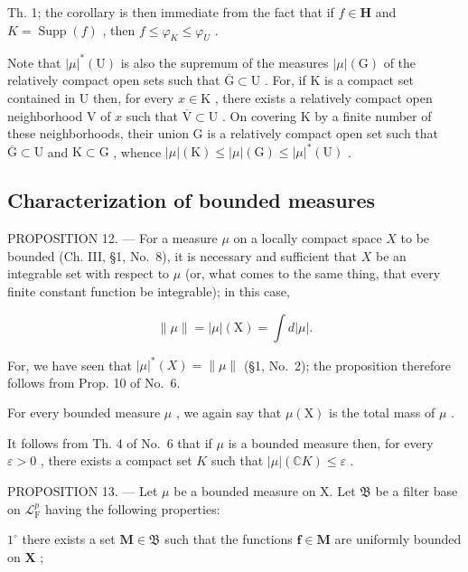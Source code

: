 Th. 1; the corollary is then immediate from the fact that if \(f \in \mathbf{H}\) and \(K = \operatorname{Supp}(f)\) , then \(f \leqslant \varphi_{K} \leqslant \varphi_{U}\) .

Note that \(|\mu|^*(\mathrm{U})\) is also the supremum of the measures \(|\mu|(\mathrm{G})\) of the relatively compact open sets such that \(\overline{\mathrm{G}} \subset \mathrm{U}\) . For, if \(\mathrm{K}\) is a compact set contained in \(\mathrm{U}\) then, for every \(x \in \mathrm{K}\) , there exists a relatively compact open neighborhood \(\mathrm{V}\) of \(x\) such that \(\overline{\mathrm{V}} \subset \mathrm{U}\) . On covering \(\mathrm{K}\) by a finite number of these neighborhoods, their union \(\mathrm{G}\) is a relatively compact open set such that \(\overline{\mathrm{G}} \subset \mathrm{U}\) and \(\mathrm{K} \subset \mathrm{G}\) , whence \(|\mu|(\mathrm{K}) \leqslant |\mu|(\mathrm{G}) \leqslant |\mu|^*(\mathrm{U})\) .

\subsection{Characterization of bounded measures}

PROPOSITION 12. --- For a measure \(\mu\) on a locally compact space \(X\) to be bounded (Ch. III, §1, No.~8), it is necessary and sufficient that \(X\) be an integrable set with respect to \(\mu\) (or, what comes to the same thing, that every finite constant function be integrable); in this case,

\[
\| \mu \| = | \mu | (\mathrm{X}) = \int d | \mu |.
\]

For, we have seen that \(|\mu|^{*}(X) = \|\mu\|\) (§1, No.~2); the proposition therefore follows from Prop. 10 of No.~6.

For every bounded measure \(\mu\) , we again say that \(\mu(\mathrm{X})\) is the total mass of \(\mu\) .

It follows from Th. 4 of No.~6 that if \(\mu\) is a bounded measure then, for every \(\varepsilon > 0\) , there exists a compact set \(K\) such that \(|\mu| (\mathbb{C}K) \leqslant \varepsilon\) .

PROPOSITION 13. --- Let \(\mu\) be a bounded measure on X. Let \(\mathfrak{B}\) be a filter base on \(\mathcal{L}_{\mathrm{F}}^{p}\) having the following properties:

\(1^{\circ}\) there exists a set \(\mathbf{M} \in \mathfrak{B}\) such that the functions \(\mathbf{f} \in \mathbf{M}\) are uniformly bounded on \(\mathbf{X}\) ;

